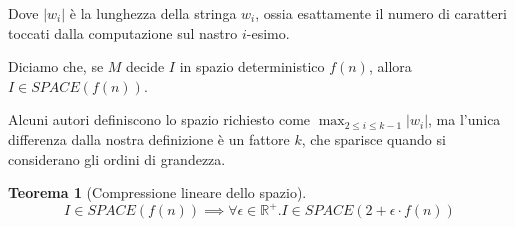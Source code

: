 \documentclass[a4paper,10pt,oneside]{article}
\theoremstyle{break}
\newtheorem{teo}{Teorema}[subsection]
\begin{document}
Dove $|w_i|$ è la lunghezza della stringa $w_i$, ossia esattamente il numero di caratteri toccati dalla computazione sul nastro $i$-esimo.\smallskip

Diciamo che, se $M$ decide $I$ in spazio deterministico $f(n)$, allora $I \in SPACE(f(n))$.\smallskip


Alcuni autori definiscono lo spazio richiesto come $\max_{2 \leq i \leq k-1}|w_i|$, ma l'unica differenza dalla nostra definizione è un fattore $k$, che sparisce quando si considerano gli ordini di grandezza.
\begin{mdframed}
\begin{teo}[Compressione lineare dello spazio]
\[I \in SPACE(f(n)) \implies \forall \epsilon \in \mathbb R^+ . I \in SPACE (2 + \epsilon \cdot f(n))\]
\end{teo}
\end{mdframed}
\end{document}
